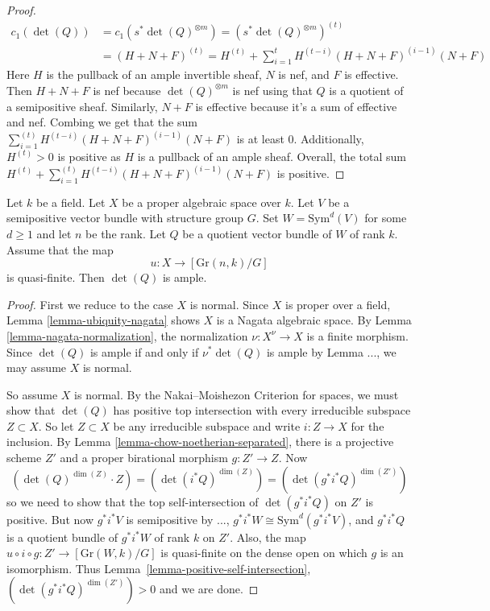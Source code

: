 \begin{proof}
\begin{align*}
c_1(\det(Q)) & =c_1(s^*\det(Q)^{\otimes m})=(s^*\det(Q)^{\otimes m})^{(t)}\\ & =(H+N+F)^{(t)}=H^{(t)}+\sum\limits_{i=1}^{t} H^{(t-i)}(H+N+F)^{(i-1)}(N+F)
\end{align*} 
 Here $H$ is the pullback of an ample invertible sheaf, $N$ is nef, and $F$ is effective. Then $H+N+F$ is nef because $\det(Q)^{\otimes m}$ is nef using that $Q$ is a quotient of a semipositive sheaf.  Similarly, $N+F$ is effective because it's a sum of effective and nef. Combing we get that the sum $\sum\limits_{i=1}^{(t)} H^{(t-i)}(H+N+F)^{(i-1)}(N+F)$ is at least 0. Additionally, $H^{(t)}>0$ is positive as $H$ is a pullback of an ample sheaf. Overall, the total sum $H^{(t)}+\sum\limits_{i=1}^{(t)} H^{(t-i)}(H+N+F)^{(i-1)}(N+F)$ is positive. 
\end{proof}

\begin{lemma}
Let $k$ be a field.
Let $X$ be a proper algebraic space over $k$.
Let $V$ be a semipositive vector bundle with structure group $G$.
Set $W = \mathrm{Sym}^d(V)$ for some $d \geq 1$ and let $n$ be the rank.
Let $Q$ be a quotient vector bundle of $W$ of rank $k$.
Assume that the map
$$
u : X \to [\mathrm{Gr}(n,k)/G]
$$
is quasi-finite.
Then $\det(Q)$ is ample.
\end{lemma}

\begin{proof}
First we reduce to the case $X$ is normal.
Since $X$ is proper over a field, Lemma \ref{lemma-ubiquity-nagata} shows $X$
is a Nagata algebraic space.
By Lemma \ref{lemma-nagata-normalization}, the normalization
$\nu : X^\nu \to X$ is a finite morphism.
Since $\det(Q)$ is ample if and only if $\nu^*\det(Q)$ is ample by
Lemma ..., we may
assume $X$ is normal.

So assume $X$ is normal.
By the Nakai--Moishezon Criterion for spaces,
we must show that $\det(Q)$ has positive top intersection with
every irreducible subspace $Z \subset X$.
So let $Z \subset X$ be any irreducible subspace and write $i : Z \to X$ for
the inclusion.
By Lemma \ref{lemma-chow-noetherian-separated}, there is a projective
scheme $Z'$ and a proper birational morphism $g : Z' \to Z$.
Now
$$
  (\det(Q)^{\dim(Z)} \cdot Z)
    = (\det(i^*Q)^{\dim(Z)})
    = (\det(g^*i^*Q)^{\dim(Z')})
$$
so we need to show that the top self-intersection of $\det(g^*i^*Q)$ on $Z'$
is positive.
But now $g^*i^*V$ is semipositive by ...,
$g^*i^*W \cong \mathrm{Sym}^d(g^*i^*V)$, and $g^*i^*Q$ is a
quotient bundle of $g^*i^*W$ of rank $k$ on $Z'$.
Also, the map $u \circ i \circ g : Z' \to [\mathrm{Gr}(W,k)/G]$ is quasi-finite
on the dense open on which $g$ is an isomorphism.
Thus Lemma~\ref{lemma-positive-self-intersection},
$(\det(g^*i^*Q)^{\dim(Z')}) > 0$ and we are done.
  


  
\end{proof}





